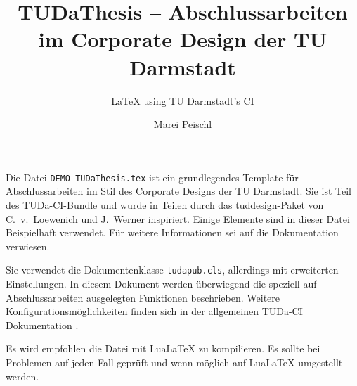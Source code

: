 \documentclass[
	german,%
	accentcolor=9c,%
	ruledheaders=section,%
	class=report,%
	thesis={type=bachelor},%
	fontsize=11pt,%
	parskip=half-,%
	custommargins=true,%
	marginpar=false,%
]{tudapub}
\title{TUDaThesis -- Abschlussarbeiten im Corporate Design der TU Darmstadt}
\subtitle{\LaTeX{} using TU Darmstadt's CI}
\author{Marei Peischl}
\institute{Institut}
\newcommand*{\file}[1]{\texttt{#1}}
\begin{document}
\maketitle


\tableofcontents



Die Datei \file{DEMO-TUDaThesis.tex} ist ein grundlegendes Template für Abschlussarbeiten im Stil des Corporate Designs der TU Darmstadt.
Sie ist Teil des TUDa-CI-Bundle und wurde in Teilen durch das tuddesign-Paket von C.~v.~Loewenich und J.~Werner inspiriert.
Einige Elemente sind in dieser Datei Beispielhaft verwendet. Für weitere Informationen sei auf die Dokumentation \cite{tuda-ci} verwiesen.

Sie verwendet die Dokumentenklasse \file{tudapub.cls}, allerdings mit erweiterten Einstellungen.
In diesem Dokument werden überwiegend die speziell auf Abschlussarbeiten ausgelegten Funktionen beschrieben.
Weitere Konfigurationsmöglichkeiten finden sich in der allgemeinen TUDa-CI Dokumentation \cite{tuda-ci}.

Es wird empfohlen die Datei mit Lua\LaTeX{} zu kompilieren. Es sollte bei Problemen auf jeden Fall geprüft und wenn möglich auf Lua\LaTeX{} umgestellt werden.

\end{document}
